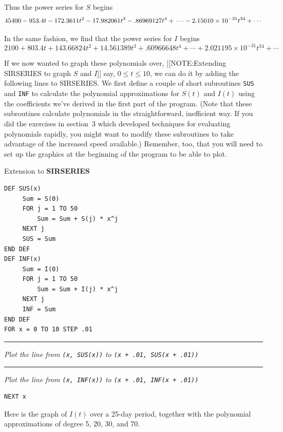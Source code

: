 Thus the power series for $S$ begins
\small
 \[
45400 - 953.4t - 172.3611t^2 - 17.982061t^3 - .86969127t^4 + \\ \cdots - 2.15010\times 10^{-31}t^{34} + \cdots
\]
\normalsize

In the same fashion, we find that the power series for $I$ begins
\small
\[
2100 +803.4t + 143.66824t^2 + 14.561389t^3 + .60966648t^4 + \cdots + 2.021195\times 10^{-31}t^{34} + \cdots
\]
\normalsize

If we now wanted to graph these polynomials over, 
[[NOTE:Extending SIRSERIES to graph $S$ and $I$]]
say, $0\le t\le 10$, we can do it by adding the following lines to
SIRSERIES.  We first define a couple of short subroutines {\tt SUS}
and {\tt INF} to calculate
the polynomial approximations for $S(t)$ and $I(t)$ using the
coefficients we've derived in the first part of the program.  (Note
that these subroutines calculate polynomials in the straightforward,
inefficient way.  If you did the exercises in section~3 which developed
techniques for evaluating polynomials rapidly, you might want to
modify these subroutines to take advantage of the increased speed
available.)  Remember, too, that you will need to set up the graphics
at the beginning of the program to be able to plot.



\begin{center}
Extension to \textbf{SIRSERIES}
\end{center}




\begin{verbatim}
DEF SUS(x)
     Sum = S(0)
     FOR j = 1 TO 50
         Sum = Sum + S(j) * x^j
     NEXT j
     SUS = Sum
END DEF
DEF INF(x)
     Sum = I(0)
     FOR j = 1 TO 50
         Sum = Sum + I(j) * x^j
     NEXT j
     INF = Sum
END DEF
FOR x = 0 TO 10 STEP .01
\end{verbatim}

\rule{24pt}{0pt} {\sl Plot the line from 
                {\tt (x, SUS(x))}} {\sl to 
                {\tt (x + .01, SUS(x + .01))}}\\
\rule{24pt}{0pt} {\sl Plot the line from 
                {\tt (x, INF(x))}} {\sl to 
                {\tt (x + .01, INF(x + .01))}}\\

\begin{verbatim}
NEXT x
\end{verbatim}

Here is the graph of $I(t)$ over a 25-day period, together with the polynomial approximations of degree 5, 20, 30, and 70.

